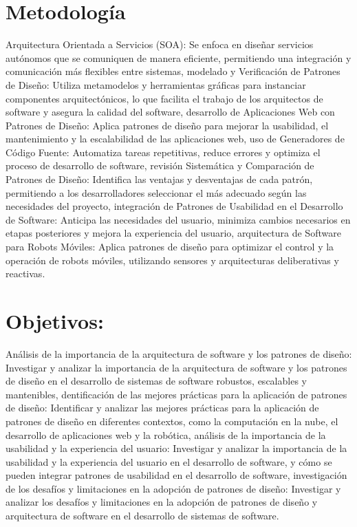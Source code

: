 \documentclass[twocolumn]{article}
\begin{document}
\section{Metodología}
Arquitectura Orientada a Servicios (SOA): Se enfoca en diseñar servicios autónomos que se comuniquen de manera eficiente, permitiendo una integración y comunicación más flexibles entre sistemas, modelado y Verificación de Patrones de Diseño: Utiliza metamodelos y herramientas gráficas para instanciar componentes arquitectónicos, lo que facilita el trabajo de los arquitectos de software y asegura la calidad del software, desarrollo de Aplicaciones Web con Patrones de Diseño: Aplica patrones de diseño para mejorar la usabilidad, el mantenimiento y la escalabilidad de las aplicaciones web, uso de Generadores de Código Fuente: Automatiza tareas repetitivas, reduce errores y optimiza el proceso de desarrollo de software, revisión Sistemática y Comparación de Patrones de Diseño: Identifica las ventajas y desventajas de cada patrón, permitiendo a los desarrolladores seleccionar el más adecuado según las necesidades del proyecto, integración de Patrones de Usabilidad en el Desarrollo de Software: Anticipa las necesidades del usuario, minimiza cambios necesarios en etapas posteriores y mejora la experiencia del usuario, arquitectura de Software para Robots Móviles: Aplica patrones de diseño para optimizar el control y la operación de robots móviles, utilizando sensores y arquitecturas deliberativas y reactivas.

\section{Objetivos:}
Análisis de la importancia de la arquitectura de software y los patrones de diseño: Investigar y analizar la importancia de la arquitectura de software y los patrones de diseño en el desarrollo de sistemas de software robustos, escalables y mantenibles, dentificación de las mejores prácticas para la aplicación de patrones de diseño: Identificar y analizar las mejores prácticas para la aplicación de patrones de diseño en diferentes contextos, como la computación en la nube, el desarrollo de aplicaciones web y la robótica, análisis de la importancia de la usabilidad y la experiencia del usuario: Investigar y analizar la importancia de la usabilidad y la experiencia del usuario en el desarrollo de software, y cómo se pueden integrar patrones de usabilidad en el desarrollo de software, investigación de los desafíos y limitaciones en la adopción de patrones de diseño: Investigar y analizar los desafíos y limitaciones en la adopción de patrones de diseño y arquitectura de software en el desarrollo de sistemas de software.
\end{document}
